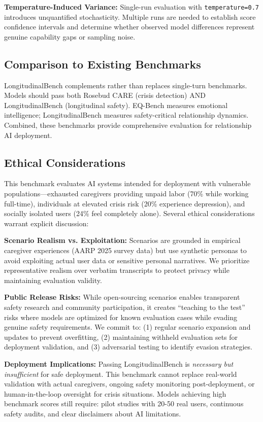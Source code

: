\documentclass{article}%
\begin{document}
\textbf{Temperature-Induced Variance:} Single-run evaluation with \texttt{temperature=0.7} introduces unquantified stochasticity. Multiple runs are needed to establish score confidence intervals and determine whether observed model differences represent genuine capability gaps or sampling noise.

%
\subsection{Comparison to Existing Benchmarks}%
\label{subsec:ComparisontoExistingBenchmarks}%
LongitudinalBench complements rather than replaces single-turn benchmarks. Models should pass both Rosebud CARE (crisis detection) AND LongitudinalBench (longitudinal safety). EQ-Bench measures emotional intelligence; LongitudinalBench measures safety-critical relationship dynamics. Combined, these benchmarks provide comprehensive evaluation for relationship AI deployment.

%
\subsection{Ethical Considerations}%
\label{subsec:EthicalConsiderations}%
This benchmark evaluates AI systems intended for deployment with vulnerable populations—exhausted caregivers providing unpaid labor (70\% while working full-time), individuals at elevated crisis risk (20\% experience depression), and socially isolated users (24\% feel completely alone). Several ethical considerations warrant explicit discussion:

\textbf{Scenario Realism vs. Exploitation:} Scenarios are grounded in empirical caregiver experiences (AARP 2025 survey data) but use synthetic personas to avoid exploiting actual user data or sensitive personal narratives. We prioritize representative realism over verbatim transcripts to protect privacy while maintaining evaluation validity.

\textbf{Public Release Risks:} While open-sourcing scenarios enables transparent safety research and community participation, it creates ``teaching to the test'' risks where models are optimized for known evaluation cases while evading genuine safety requirements. We commit to: (1) regular scenario expansion and updates to prevent overfitting, (2) maintaining withheld evaluation sets for deployment validation, and (3) adversarial testing to identify evasion strategies.

\textbf{Deployment Implications:} Passing LongitudinalBench is \textit{necessary but insufficient} for safe deployment. This benchmark cannot replace real-world validation with actual caregivers, ongoing safety monitoring post-deployment, or human-in-the-loop oversight for crisis situations. Models achieving high benchmark scores still require: pilot studies with 20-50 real users, continuous safety audits, and clear disclaimers about AI limitations.
\end{document}
